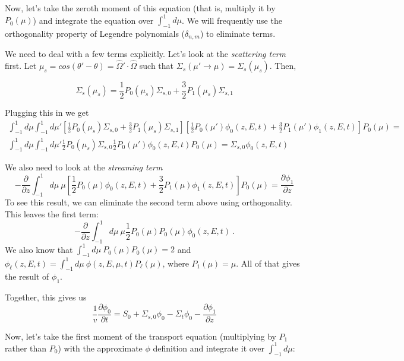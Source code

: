 \documentclass[12pt]{article}
\newcommand{\omvec}{\ensuremath{\hat{\Omega}}}
\newcommand{\el}{\ensuremath{\ell}}
\newcommand{\sigso}{\ensuremath{\Sigma_{s,0}}}
\newcommand{\sigsi}{\ensuremath{\Sigma_{s,1}}}
\begin{document}
Now, let's take the zeroth moment of this equation (that is, multiply it by $P_0(\mu)$) and integrate the
equation over $\int_{-1}^{1}d\mu$. We will frequently use the orthogonality property of Legendre polynomials ($\delta_{n,m}$) to eliminate terms.

We need to deal with a few terms explicitly. Let's look at the \textit{scattering term} first. Let $\mu_s = cos(\theta'-\theta) = \omvec'\cdot\omvec$ such that
$\Sigma_s(\mu'\rightarrow\mu) = \Sigma_s(\mu_s)$. Then,

\begin{equation*}
\Sigma_s(\mu_s) = \frac{1}{2}P_0(\mu_s)\sigso + \frac{3}{2}P_1(\mu_s)\sigsi
\end{equation*}

Plugging this in we get
\begin{multline*}
\int_{-1}^{1}d\mu\int_{-1}^{1}d\mu'\left[\frac{1}{2}P_0(\mu_s)\sigso+\frac{3}{2}P_1(\mu_s)\sigsi\right]
\left[\frac{1}{2}P_0(\mu')\phi_0(z,E,t)+\frac{3}{2}P_1(\mu')\phi_1(z,E,t)\right]P_0(\mu) = \\
\int_{-1}^{1}d\mu\int_{-1}^{1}d\mu'\frac{1}{2}P_0(\mu_s)\sigso\frac{1}{2}P_0(\mu')\phi_0(z,E,t)P_0(\mu) =
\sigso\phi_0(z,E,t)
\end{multline*}

We also need to look at the \textit{streaming term}
\begin{equation*}
-\frac{\partial}{\partial z}\int_{-1}^{1}d\mu\:\mu\left[\frac{1}{2}P_0(\mu)\phi_0(z,E,t)+\frac{3}{2}P_1(\mu)\phi_1(z,E,t)\right]P_0(\mu)
= \frac{\partial\phi_1}{\partial z}
\end{equation*}
To see this result, we can eliminate the second term above using orthogonality. This leaves the first term:
\[ -\frac{\partial}{\partial z}\int_{-1}^{1}d\mu\:\mu\frac{1}{2}P_0(\mu)P_0(\mu)\phi_0(z,E,t)\:.\]
We also know that $\int_{-1}^{1}d\mu\:P_0(\mu)P_0(\mu) = 2$ and $\phi_{\el}(z,E,t) = \int^{1}_{-1}d\mu\:\phi(z,E,\mu,t)P_{\el}(\mu)$, where $P_1(\mu) = \mu$. All of that gives the result of $\phi_1$.

\vspace*{1 em}
Together, this gives us
\begin{equation*}
\frac{1}{v}\frac{\partial\phi_0}{\partial t} = S_0 + \sigso\phi_0 - \Sigma_t\phi_0 - 
\frac{\partial\phi_1}{\partial z}
\end{equation*}

Now, let's take the first moment of the transport equation (multiplying by $P_1$ rather than $P_0$) with the approximate $\phi$ definition and 
integrate it over $\int_{-1}^{1}d\mu$:
\end{document}
